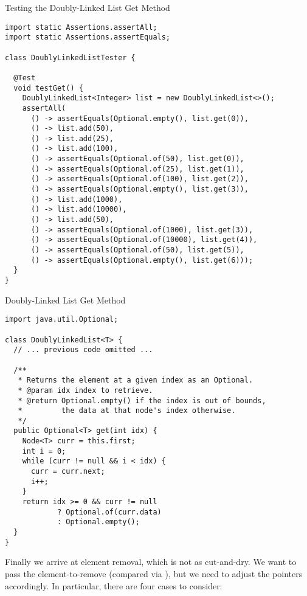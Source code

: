 \begin{cl}[]{Testing the Doubly-Linked List Get Method}
\begin{lstlisting}[language=MyJava]
import static Assertions.assertAll;
import static Assertions.assertEquals;

class DoublyLinkedListTester {

  @Test
  void testGet() {
    DoublyLinkedList<Integer> list = new DoublyLinkedList<>();
    assertAll(
      () -> assertEquals(Optional.empty(), list.get(0)),
      () -> list.add(50),
      () -> list.add(25),
      () -> list.add(100),
      () -> assertEquals(Optional.of(50), list.get(0)),
      () -> assertEquals(Optional.of(25), list.get(1)),
      () -> assertEquals(Optional.of(100), list.get(2)),
      () -> assertEquals(Optional.empty(), list.get(3)),
      () -> list.add(1000),
      () -> list.add(10000),
      () -> list.add(50),
      () -> assertEquals(Optional.of(1000), list.get(3)),
      () -> assertEquals(Optional.of(10000), list.get(4)),
      () -> assertEquals(Optional.of(50), list.get(5)),
      () -> assertEquals(Optional.empty(), list.get(6)));
  }
}
\end{lstlisting}
\end{cl}

\begin{cl}[]{Doubly-Linked List Get Method}
\begin{lstlisting}[language=MyJava]
import java.util.Optional;

class DoublyLinkedList<T> {
  // ... previous code omitted ...

  /**
   * Returns the element at a given index as an Optional.
   * @param idx index to retrieve.
   * @return Optional.empty() if the index is out of bounds,
   *         the data at that node's index otherwise.
   */
  public Optional<T> get(int idx) {
    Node<T> curr = this.first;
    int i = 0;
    while (curr != null && i < idx) {
      curr = curr.next;
      i++;
    }
    return idx >= 0 && curr != null
            ? Optional.of(curr.data)
            : Optional.empty();
  }
}
\end{lstlisting}
\end{cl}

Finally we arrive at element removal, which is not as cut-and-dry. We want to pass the element-to-remove (compared via ), but we need to adjust the pointers accordingly. In particular, there are four cases to consider:

